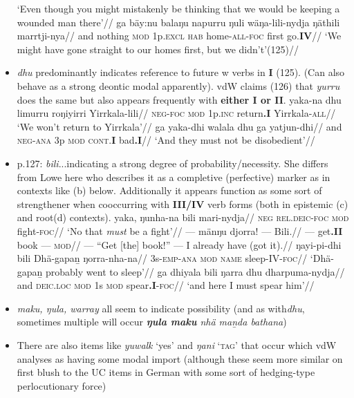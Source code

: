 \documentclass[10pt]{article}
\newcommand{\mcom}[1]
{\marginpar{\color{black}\raggedleft\raggedright\hspace{0pt}\linespread{0.9}\footnotesize{#1}}}
\begin{document}
\begin{itemize}
 	\glft`Even though you might mistakenly be thinking that we would be keeping a wounded man there'//\endgl
 	\a\begingl\gla ga bäy:nu balaŋu napurru ŋuli wäŋa-lili-nydja ŋäthili marrtji-nya//
 	\glb and nothing \textsc{mod} 1p.\textsc{excl} \textsc{hab} home\textsc{-all-foc} first go.\textbf{IV}//
 	\glft`We might have gone straight to our homes first, but we didn't'\hfill(125)//\endgl\xe
 	\item \textit{dhu} predominantly indicates reference to future w verbs in \textbf{I} (125). (Can also behave as a strong deontic modal apparently). vdW claims (126) that \textit{yurru} does the same but also appears frequently with \textbf{either I or II}.
 	\pex\a\begingl\gla yaka-na dhu limurru roŋiyirri Yirrkala-lili//
 	\glb \textsc{neg-foc} \textsc{mod} 1p\textsc{.inc} return\textbf{.I} Yirrkala\textsc{-all}//
 	\glft`We won't return to Yirrkala'//\endgl
 	\a\begingl\gla ga yaka-dhi walala dhu ga yatjun-dhi//
 	\glb and \textsc{neg-ana} 3p \textsc{mod} \textsc{cont.\textbf{I}} bad\textbf{.I}//
 	\glft`And they must not be disobedient'//\endgl\xe 
 	\item p.127: \textit{bili}...indicating a strong degree of probability/necessity. She differs from Lowe here who describes it as a completive (perfective) marker as in contexts like (\nextx b) below. Additionally it appears function as some sort of strengthener when cooccurring with \textbf{III/IV} verb forms (both in epistemic (c) and root(d) contexts).
 	\mcom{is all the flavour work done by \textit{bili} in (\lastx d)?}
 	\pex\a\begingl\gla yaka, ŋunha-na bili mari-nydja//
	 	\glb \textsc{neg} \textsc{rel.deic-foc} \textsc{mod} fight\textsc{-foc}//
	 	\glft`No that \textit{must} be a fight'//\endgl
 	\a\begingl\gla --- mänŋu djorra! --- Bili.//
	 	\glb --- get\textbf{.II} book --- \textsc{mod}//
	 	\glft --- ``Get [the] book!'' --- I already have (got it).//\endgl
	 \a\begingl\gla	ŋayi-pi-dhi bili Dhä-gapaṉ ŋorra-nha-na//
	 \glb 3s-\textsc{emp-ana} \textsc{mod} \textsc{name} sleep\textsc{-IV-foc}//
	 \glft`Dhä-gapaṉ probably went to sleep'//\endgl
	 \a\begingl \gla ga dhiyala bili ŋarra dhu dharpuma-nydja//
	 \glb and \textsc{deic.loc} \textsc{mod} 1s \textsc{mod} spear\textbf{.I}\textsc{-foc}//
	 \glft`and here I must spear him'//\endgl\xe
	
	 \item \textit{maku, ŋula, warray} all seem to indicate possibility (and as with\textit{dhu}, sometimes multiple will occur \textit{\textbf{ŋula maku }nhä maṉda bathana})
	 
	 \item There are also items like \textit{yuwalk} `yes' and \textit{ŋani} `\textsc{tag}' that occur which vdW analyses as having some modal import (although these seem more similar on first blush to the UC items in German with some sort of hedging-type perlocutionary force)
	 

\end{itemize}
\end{document}
